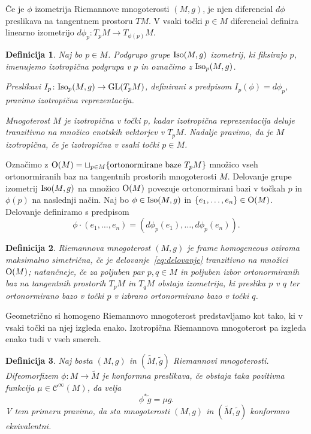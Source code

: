\documentclass[a4paper]{article}
\newtheorem{definicija}{Definicija}
\begin{document}
Če je $\phi$ izometrija Riemannove mnogoterosti $(M,g)$, je njen diferencial $d\phi$ preslikava na tangentnem prostoru $TM$. V vsaki točki $p \in M$ diferencial definira linearno izometrijo $d\phi_{p} \colon T_{p}M \to T_{\phi(p)}M$.

\begin{definicija}
Naj bo $p \in M$. Podgrupo grupe $\textup{Iso}(M,g)$ izometrij, ki fiksirajo $p$, imenujemo \emph{izotropična podgrupa} v $p$ in označimo z 
$\textup{Iso}_{p}(M,g)$. 

Preslikavi $I_{p} \colon \textup{Iso}_{p}(M,g) \to \textup{GL}(T_{p}M)$, definirani s predpisom $I_{p}(\phi) = d\phi_{p}$, pravimo \emph{izotropična reprezentacija}.

Mnogoterost $M$ je \emph{izotropična v točki $p$}, kadar izotropična reprezentacija deluje tranzitivno na množico enotskih vektorjev v $T_{p}M$. Nadalje pravimo, da je $M$ \emph{izotropična}, če je izotropična v vsaki točki $p \in M$.
\end{definicija}

Označimo z $\textup{O}(M) = \sqcup_{p \in M} \{ \text{ortonormirane baze} \ T_{p}M \}$ množico vseh ortonormiranih baz na tangentnih prostorih mnogoterosti $M$. Delovanje grupe izometrij $\textup{Iso}(M,g)$ na množico $\textup{O}(M)$ povezuje ortonormirani bazi v točkah $p$ in $\phi(p)$ na naslednji način. Naj bo $\phi \in \textup{Iso}(M,g)$ in $\{e_{1}, \dots , e_{n} \} \in \textup{O}(M)$. Delovanje definiramo s predpisom
\begin{equation}\label{eq:delovanje}
\phi \cdot (e_{1}, \dots , e_{n}) = (d\phi_{p}(e_{1}), \dots , d\phi_{p}(e_{n})).
\end{equation}

\begin{definicija}
Riemannova mnogoterost $(M,g)$ je \emph{frame homogeneous} oziroma \emph{maksimalno simetrična}, če je delovanje~\ref{eq:delovanje} tranzitivno na množici $\textup{O}(M)$; natančneje, če za poljuben par $p,q \in M$ in poljuben izbor ortonormiranih baz na tangentnih prostorih $T_{p}M$ in $T_{q}M$ obstaja izometrija, ki preslika $p$ v $q$ ter ortonormirano bazo v točki $p$ v izbrano ortonormirano bazo v točki $q$.
\end{definicija}

Geometrično si homogeno Riemannovo mnogoterost predstavljamo kot tako, ki v vsaki točki na njej izgleda enako.
Izotropična Riemannova mnogoterost pa izgleda enako tudi v vseh smereh.

\begin{definicija}
Naj bosta $(M,g)$ in $(\tilde{M}, \tilde{g})$ Riemannovi mnogoterosti. Difeomorfizem $\phi \colon M \to \tilde{M}$ je \emph{konformna preslikava}, če obstaja taka pozitivna funkcija $\mu \in \mathcal{C}^{\infty}(M)$, da velja
\[ \phi^{*}\tilde{g} = \mu g. \]
V tem primeru pravimo, da sta mnogoterosti $(M,g)$ in $(\tilde{M}, \tilde{g})$ \emph{konformno ekvivalentni}.
\end{definicija}
\end{document}
